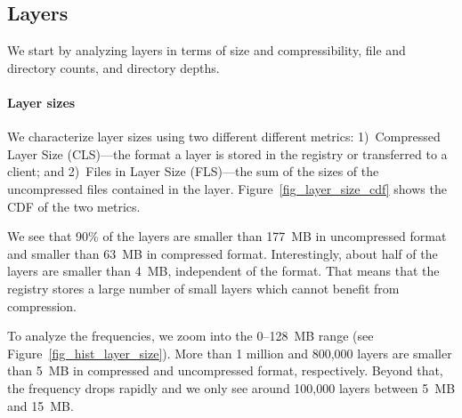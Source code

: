 \subsection{Layers}
\label{sec:layers}

We start by analyzing layers in terms of size and compressibility, file and directory
counts, and directory depths.




\paragraph{Layer sizes}
%
We characterize layer sizes using two different different metrics:
%
1)~Compressed Layer Size (CLS)---the format a layer is stored in the registry or
transferred to a client;
%
%
and 2)~Files in Layer Size (FLS)---the sum of the sizes of the uncompressed files contained
in the layer.
%
Figure~\ref{fig_layer_size_cdf} shows the CDF of the two metrics.


We see that 90\% of the layers are smaller than 177~MB in uncompressed 
format and smaller than 63~MB in compressed format.
%
Interestingly, about half of the layers are smaller than 4~MB, independent
of the format. That means that the registry stores a large number of
small layers which cannot benefit from compression.
%
%

To analyze the frequencies, we zoom into the 0--128~MB range
(see Figure~\ref{fig_hist_layer_size}).
%
More than 1 million and 800,000 layers are smaller than 5~MB
in compressed and uncompressed format, respectively. Beyond that,
the frequency drops rapidly and we only see around 100,000 layers
between 5~MB and 15~MB.




